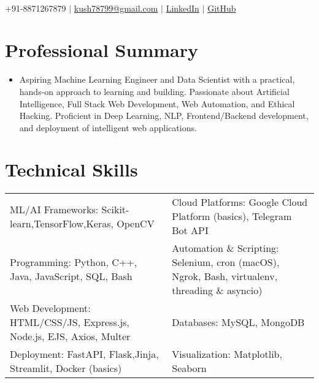 \documentclass[letterpaper,11pt]{article}
\renewcommand{\textbf}[1]{{\fontseries{sb}\selectfont #1}}  %
\newcommand{\resumeItem}[1]{
  \item{
    {#1 \vspace{-2.5pt}}  %
  }
}
\newcommand{\resumeSubHeadingListStart}{\begin{itemize}[leftmargin=0.15in, label={}]}
\newcommand{\resumeSubHeadingListEnd}{\end{itemize}}
\newcommand{\skill}[2]{
  \textbf{#1:} #2
}
\begin{document}
\begin{center}
    {\fontsize{34}{34}\selectfont\textbf{\scshape\textcolor{NavyBlue}{Kushagra Agrawal}}}\\[1pt]
    \normalsize
    +91-8871267879 \hspace{2pt} $|$ \hspace{2pt} 
    \href{mailto:kush78799@gmail.com}{\textcolor{NavyBlue}{\textbf{kush78799@gmail.com}}} \hspace{2pt} $|$ \hspace{2pt} 
    \href{https://www.linkedin.com/in/ayyekush/}{\textcolor{NavyBlue}{\textbf{LinkedIn}}} \hspace{2pt} $|$ \hspace{2pt}
    \href{https://github.com/ayyekush}{\textcolor{NavyBlue}{\textbf{GitHub}}}
\end{center}

\large\section{\textcolor{NavyBlue}{\textbf{Professional Summary}}}
\resumeSubHeadingListStart
  \resumeItem{
    Aspiring Machine Learning Engineer and Data Scientist with a practical, hands-on approach to learning and building. Passionate about Artificial Intelligence, Full Stack Web Development, Web Automation, and Ethical Hacking. Proficient in Deep Learning, NLP, Frontend/Backend development, and deployment of intelligent web applications.
  }
\resumeSubHeadingListEnd




\large\section{\textcolor{NavyBlue}{\textbf{Technical Skills}}}
\begin{tabular}{p{}@{\hspace{1.5em}}p{}}
\skill{ML/AI Frameworks}{Scikit-learn,TensorFlow,Keras, OpenCV} & \skill{Cloud Platforms}{Google Cloud Platform (basics), Telegram Bot API} \\[4pt]
\skill{Programming}{Python, C++, Java, JavaScript, SQL, Bash}  & \skill{Automation \& Scripting}{Selenium, cron (macOS), Ngrok, Bash, virtualenv, threading \& asyncio)}  \\[4pt]
\skill{Web Development}{HTML/CSS/JS, Express.js, Node.js, EJS, Axios, Multer} & \skill{Databases}{MySQL, MongoDB}  \\[4pt]
\skill{Deployment}{FastAPI, Flask,Jinja, Streamlit, Docker (basics)} &
\skill{Visualization}{Matplotlib, Seaborn}  \\[4pt]
\end{tabular}
\end{document}
